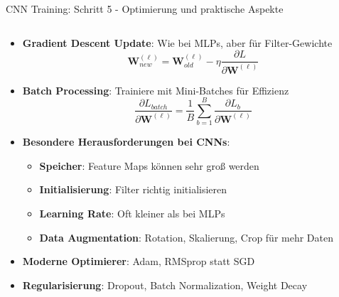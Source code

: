 \documentclass[aspectratio=1610, xcolor=dvipsnames, 9pt]{beamer}
\begin{document}
      \begin{frame}{CNN Training: Schritt 5 - Optimierung und praktische Aspekte}
        \begin{columns}
          \begin{column}{1\textwidth}
            \begin{itemize}
              \item \textbf{Gradient Descent Update}: Wie bei MLPs, aber für Filter-Gewichte
              \begin{equation}
                \mathbf{W}^{(\ell)}_{new} = \mathbf{W}^{(\ell)}_{old} - \eta \frac{\partial L}{\partial \mathbf{W}^{(\ell)}}
              \end{equation}
              \item \textbf{Batch Processing}: Trainiere mit Mini-Batches für Effizienz
              \begin{equation}
                \frac{\partial L_{batch}}{\partial \mathbf{W}^{(\ell)}} = \frac{1}{B} \sum_{b=1}^{B} \frac{\partial L_b}{\partial \mathbf{W}^{(\ell)}}
              \end{equation}
              \item \textbf{Besondere Herausforderungen bei CNNs}:
              \begin{itemize}
                \item \textbf{Speicher}: Feature Maps können sehr groß werden
                \item \textbf{Initialisierung}: Filter richtig initialisieren
                \item \textbf{Learning Rate}: Oft kleiner als bei MLPs
                \item \textbf{Data Augmentation}: Rotation, Skalierung, Crop für mehr Daten
              \end{itemize}
              \item \textbf{Moderne Optimierer}: Adam, RMSprop statt SGD
              \item \textbf{Regularisierung}: Dropout, Batch Normalization, Weight Decay
            \end{itemize}
          \end{column}
        \end{columns}
      \end{frame}
\end{document}

